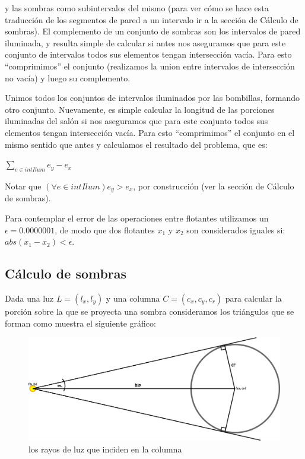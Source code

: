 y las sombras como subintervalos del mismo (para ver cómo se hace esta traducción de los segmentos
de pared a un intervalo ir a la sección de Cálculo de sombras).
El complemento de un conjunto de sombras son los intervalos de pared iluminada, y resulta simple
de calcular si antes nos aseguramos que para este conjunto de intervalos todos sus elementos tengan
intersección vacía. Para esto ``comprimimos'' el conjunto (realizamos la union entre intervalos de
intersección no vacía) y luego su complemento.

Unimos todos los conjuntos de intervalos iluminados por las bombillas, formando otro conjunto.
Nuevamente, es simple calcular la longitud de las porciones iluminadas del salón si nos aseguramos que
para este conjunto todos sus elementos tengan intersección vacía. Para esto ``comprimimos'' el conjunto
en el mismo sentido que antes y calculamos el resultado del problema, que es:

\vspace{0.2cm}
\begin{center}$\displaystyle\sum_{e \in intIlum}e_y - e_x$\end{center}
\vspace{0.2cm}

Notar que $(\forall e \in intIlum)e_y > e_x$, por construcción (ver la sección de
Cálculo de sombras).

Para contemplar el error de las operaciones entre flotantes utilizamos un $\epsilon = 0.0000001$, 
de modo que dos flotantes $x_1$ y $x_2$ son considerados iguales si: $abs(x_1 - x_2) < \epsilon$.

\subsection*{Cálculo de sombras}
Dada una luz $L = (l_x, l_y)$ y una columna $C = (c_x, c_y, c_r)$ para calcular la porción sobre
la que se proyecta una sombra consideramos los triángulos que se forman como muestra el siguiente
gráfico:

\begin{figure}[H]
\centering
\label{bl_3}
\includegraphics[scale=1.0]{./figuras/bl_3.png}
\caption{los rayos de luz que inciden en la columna}
\end{figure} 

